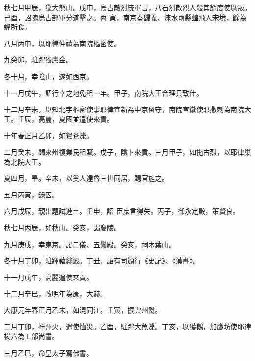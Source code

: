 \begin{pinyinscope}
 秋七月甲辰，獵大熊山。戊申，烏古敵烈統軍言，八石烈敵烈人殺其節度使以叛。己酉，詔隗烏古部軍分道擊之。丙
 寅，南京奏歸義、淶水兩縣蝗飛入宋境，餘為蜂所食。



 八月丙申，以耶律仲禧為南院樞密使。



 九癸卯，駐蹕獨盧金。



 冬十月，幸陰山，遂如西京。



 十一月戊午，詔行幸之地免租一年。甲子，南院大王合理只致仕。



 十二月辛未，以知北字樞密使事耶律宜新為中京留守，南院宣徽使耶撒刺為南院大王。壬辰，高麗，夏國並遣使來貢。



 十年春正月乙卯，如鴛鴦濼。



 二月癸未，蠲來州復業民租賦。戊子，陰卜來貢。三月甲子，如拖古烈，以耶律巢為北院大王。



 夏四月，旱。辛未，以奚人達魯三世同居，賜官旌之。



 五月丙寅，錄囚。



 六月戊辰，親出題試進土。壬申，詔
 臣庶言得失。丙子，御永定殿，策賢良。



 秋七月丙辰，如秋山。癸亥，謁慶陵。



 九月庚戌，幸東京。謁二儀、五鸞殿。癸亥，祠木葉山。



 冬十月丁卯，駐蹕藉絲澱。丁丑，詔有司頒行《史記》、《漢書》。



 十一月戊午，高麗遣使來貢。



 十二月辛巳，改明年為康，大赫。



 大康元年春正月乙未，如混同江。壬寅，振雲州饑。



 二月丁卯，祥州火，遣使恤災。乙酉，駐蹕大魚濼。丁亥，以獲鵝，加鷹坊使耶律楊六為工部尚書。



 三月乙巳，命皇太子寫佛書。




\end{pinyinscope}
